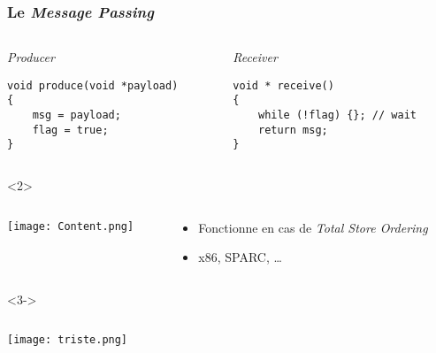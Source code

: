 \documentclass[xcolor={x11names,svgnames},x11names,svgnames]{beamer}
\begin{document}


\begin{frame}[fragile, label=tso_mp]
  \frametitle{Le \emph{Message Passing} }
  
  \begin{columns}
    \begin{column}{0.5\textwidth}
      \begin{block}{\emph{Producer}}
\begin{verbatim}
void produce(void *payload)
{          
    msg = payload;
    flag = true;
}
\end{verbatim}
      \end{block}
    \end{column}  
    \begin{column}{0.5\textwidth}
      \begin{block}{\emph{Receiver}}
\begin{verbatim}
void * receive()
{  
    while (!flag) {}; // wait
    return msg;
}
\end{verbatim}
      \end{block}
    \end{column}
  \end{columns}

  \begin{overlayarea}{\textwidth}{1cm}
    \begin{onlyenv}<2>
      \begin{columns}[c]
        \begin{column}{.1\textwidth}
          \vspace{1mm}
          \texttt{[image: Content.png]}
        \end{column}

        \begin{column}{.9\textwidth}
          \begin{itemize}        \small
          \item Fonctionne en cas de  \emph{Total Store Ordering}
          \item x86, SPARC, \dots
          \end{itemize}
        \end{column}
      \end{columns}
    \end{onlyenv}
    
    \begin{onlyenv}<3->  
      \begin{columns}[c]
        \begin{column}{.1\textwidth}
          \vspace{3mm}
          \texttt{[image: triste.png]}
        \end{column}
        

\end{columns}
\end{onlyenv}
\end{overlayarea}
\end{frame}
\end{document}
